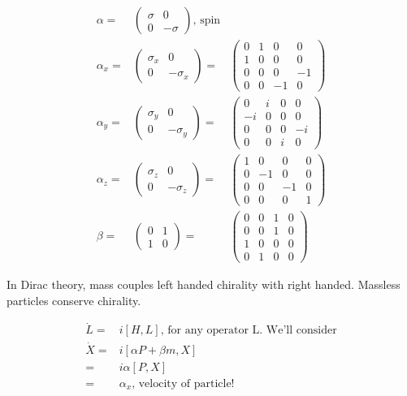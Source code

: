 \documentclass[]{article}
\begin{document}
\begin{align*}
	\alpha =& \begin{pmatrix}
		\sigma&0 \\
		0&-\sigma
	\end{pmatrix} \text{, spin}\\ 
	\alpha_x =& \begin{pmatrix}
		\sigma_x&0\\
		0&-\sigma_x
	\end{pmatrix}=&\begin{pmatrix}
		0&1&0&0\\
		1&0&0&0\\
		0&0&0&-1\\
		0&0&-1&0
	\end{pmatrix}\\
	\alpha_y =& \begin{pmatrix}
	\sigma_y&0\\
	0&-\sigma_y
	\end{pmatrix}=&\begin{pmatrix}
	0&i&0&0\\
	-i&0&0&0\\
	0&0&0&-i\\
	0&0&i&0
	\end{pmatrix}\\
	\alpha_z =& \begin{pmatrix}
	\sigma_z&0\\
	0&-\sigma_z
	\end{pmatrix}=&\begin{pmatrix}
	1&0&0&0\\
	0&-1&0&0\\
	0&0&-1&0\\
	0&0&0&1
	\end{pmatrix}\\
	\beta =& \begin{pmatrix}
		0&1\\
		1&0
	\end{pmatrix} =& \begin{pmatrix}
	0&0&1&0\\
	0&0&1&0\\
	1&0&0&0\\
	0&1&0&0
	\end{pmatrix}
\end{align*}

In Dirac theory, mass couples left handed chirality with right handed. Massless particles conserve chirality.

\begin{align*}
\dot L =& i [H,L] \text{, for any operator L. We'll consider}\\
\dot X =& i[\alpha P + \beta m,X]\\
=& i \alpha [P,X]\\
=&\alpha_x \text{, velocity of particle!}
\end{align*}
\end{document}

